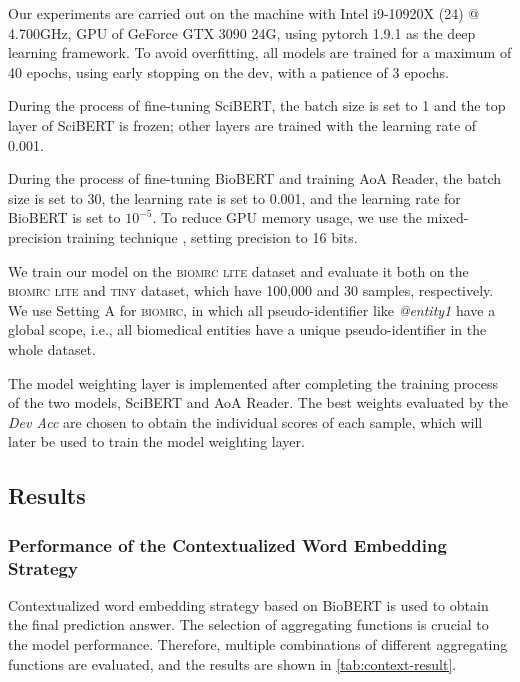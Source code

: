 \documentclass[sigconf, screen]{acmart}
\newcommand{\biomrc}{{\scshape{biomrc}}\xspace}
\newcommand{\biomrclite}{{\scshape{biomrc lite}}\xspace}
\newcommand{\scibert}{Sci\-BERT\xspace}
\newcommand{\biobert}{Bio\-BERT\xspace}
\newcommand{\aoa}{AoA Reader\xspace}
\begin{document}
Our experiments are carried out on the machine with Intel i9-10920X (24) @ 4.700GHz, GPU of GeForce GTX 3090 24G, using pytorch 1.9.1 as the deep learning framework. To avoid overfitting, all models are trained for a maximum of 40 epochs, using early stopping on the dev, with a patience of 3 epochs.

During the process of fine-tuning \scibert, the batch size is set to 1 and the top layer of \scibert is frozen; other layers are trained with the learning rate of 0.001.

During the process of fine-tuning \biobert and training \aoa, the batch size is set to 30, the learning rate is set to 0.001, and the learning rate for \biobert is set to $10^{-5}$. To reduce GPU memory usage, we use the mixed-precision training technique \cite{micikeviciusMixedPrecisionTraining2018}, setting precision to 16 bits.

We train our model on the \biomrclite dataset and evaluate it both on the \biomrc { \scshape lite } and { \scshape tiny } dataset, which have 100,000 and 30 samples, respectively. We use Setting A for \biomrc, in which all pseudo-identifier like \emph{@entity1} have a global scope, i.e., all biomedical entities have a unique pseudo-identifier in the whole dataset.




The model weighting layer is implemented after completing the training process of the two models, SciBERT and \aoa. The best weights evaluated by the \emph{Dev Acc} are chosen to obtain the individual scores of each sample, which will later be used to train the model weighting layer.

\subsection{Results}

\subsubsection{Performance of the Contextualized Word Embedding Strategy}

Contextualized word embedding strategy based on \biobert is used to obtain the final prediction answer. The selection of aggregating functions is crucial to the model performance. Therefore, multiple combinations of different aggregating functions are evaluated, and the results are shown in \cref{tab:context-result}.
\end{document}
